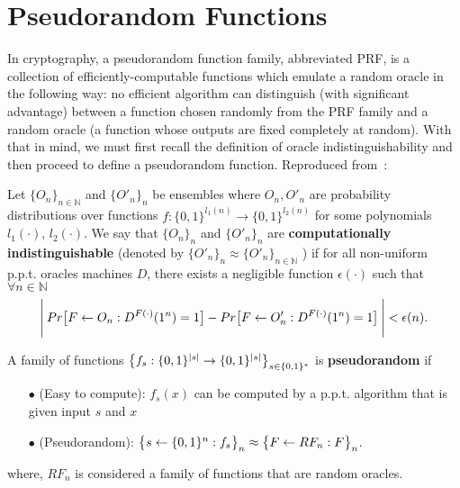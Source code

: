 \section{Pseudorandom Functions} \label{sec:PRF}
In cryptography, a pseudorandom function family, abbreviated PRF, is a collection of efficiently-computable functions which emulate a random oracle in the following way: no efficient algorithm can distinguish (with significant advantage) between a function chosen randomly from the PRF family and a random oracle (a function whose outputs are fixed completely at random). With that in mind,
we must first recall the definition of oracle indistinguishability and then proceed to define a pseudorandom function. Reproduced from~\cite{ACI}:

\begin{definition}
  Let $\{ O_n \}_{n \in \mathbb{N}}$ and $\{ O'_{n} \}_{n}$ be ensembles where $O_n, O'_n$ are probability
  distributions over functions $f: \{ 0,1 \}^{l_1(n)} \rightarrow \{ 0,1 \}^{l_2(n)}$ for some polynomials $l_1(\cdot)$, $l_2(\cdot)$. We say that $\{ O_{n} \}_{n}$ and $\{ O'_{n} \}_{n}$ are \textbf{computationally indistinguishable} (denoted by $\{ O'_{n} \}_{n} \approx \{ O'_n \}_{n \in \mathbb{N}}$
  ) if for all non-uniform p.p.t. oracles machines $D$, there exists a negligible function $\epsilon(\cdot)$ such that $\forall n \in \mathbb{N}$
  \begin{equation}{\label{oracle}}
    \Bigg{\lvert} \: Pr \big{[} F \leftarrow O_n : D^{F(\cdot)}(1^n)=1 \big{]} - Pr \big{[} F \leftarrow O'_n : D^{F(\cdot)}(1^n)=1 \big{]} \: \Bigg{\rvert} < \epsilon(n).
  \end{equation}
\end{definition}

\begin{definition}
  A family of functions $\big{\{} f_s: \{ 0,1 \}^{\lvert s \rvert} \rightarrow \{ 0,1 \}^{\lvert s \rvert} \big{\}}_{s \in \{ 0,1 \}^{*}}$ is \textbf{pseudorandom} if
  \begin{itemize}
    \item[$\bullet$] (Easy to compute): $f_s(x)$ can be computed by a p.p.t. algorithm that is given input $s$ and $x$
    \item[$\bullet$] (Pseudorandom): $\big{\{} s \leftarrow \{ 0,1 \}^n: f_s \big{\}}_n \approx \big{\{} F \leftarrow RF_n: F \big{\}}_n$.
  \end{itemize}
\end{definition}
\noindent where, $RF_{n}$ is considered a family of functions that are random oracles.

